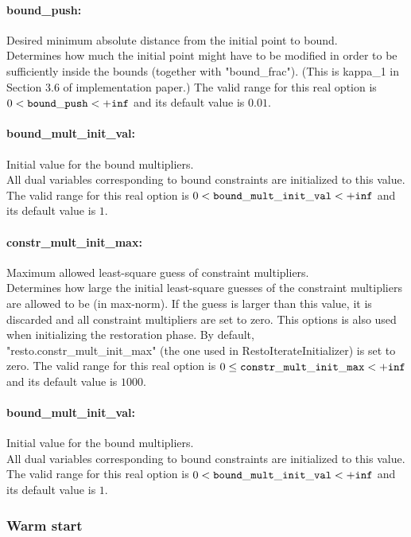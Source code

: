 \paragraph{bound\_push:} Desired minimum absolute distance from the initial point to bound. $\;$ \\
 Determines how much the initial point might have
to be modified in order to be sufficiently inside
the bounds (together with "bound\_frac").  (This
is kappa\_1 in Section 3.6 of implementation
paper.) The valid range for this real option is 
$0 <  {\tt bound\_push } <  {\tt +inf}$
and its default value is $0.01$.


\paragraph{bound\_mult\_init\_val:} Initial value for the bound multipliers. $\;$ \\
 All dual variables corresponding to bound
constraints are initialized to this value. The valid range for this real option is 
$0 <  {\tt bound\_mult\_init\_val } <  {\tt +inf}$
and its default value is $1$.


\paragraph{constr\_mult\_init\_max:} Maximum allowed least-square guess of constraint multipliers. $\;$ \\
 Determines how large the initial least-square
guesses of the constraint multipliers are allowed
to be (in max-norm). If the guess is larger than
this value, it is discarded and all constraint
multipliers are set to zero.  This options is
also used when initializing the restoration
phase. By default,
"resto.constr\_mult\_init\_max" (the one used in
RestoIterateInitializer) is set to zero. The valid range for this real option is 
$0 \le {\tt constr\_mult\_init\_max } <  {\tt +inf}$
and its default value is $1000$.


\paragraph{bound\_mult\_init\_val:} Initial value for the bound multipliers. $\;$ \\
 All dual variables corresponding to bound
constraints are initialized to this value. The valid range for this real option is 
$0 <  {\tt bound\_mult\_init\_val } <  {\tt +inf}$
and its default value is $1$.

\subsubsection{Warm start}

